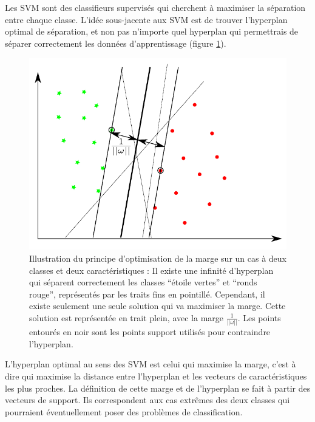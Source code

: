 Les SVM sont des classifieurs supervisés qui cherchent à maximiser la séparation entre chaque classe. L'idée sous-jacente aux SVM est de trouver l'hyperplan optimal de séparation, et non pas n'importe quel hyperplan qui permettrais de séparer correctement les données d'apprentissage (figure \ref{fig:multiPlansSeparationSVM}). 



\begin{figure}[h]
	\label{fig:multiPlansSeparationSVM}
	\begin{center}
	\includegraphics[width=15cm]{images/multiPlansSeparationSVM}
	\end{center}
	\caption{Illustration du principe d'optimisation de la marge sur un cas à deux classes et deux caractéristiques : Il existe une infinité d'hyperplan qui séparent correctement les classes ``étoile vertes'' et ``ronds rouge'', représentés par les traits fins en pointillé. Cependant, il existe seulement une seule solution qui va maximiser la marge. Cette solution est représentée en trait plein, avec la marge $\frac{1}{||\omega||}$. Les points entourés en noir sont les points support utilisés pour contraindre l'hyperplan. }
\end{figure}


L'hyperplan optimal au sens des SVM est celui qui maximise la marge, c'est à dire qui maximise la distance entre l'hyperplan et les vecteurs de caractéristiques les plus proches. La définition de cette marge et de l'hyperplan se fait à partir des vecteurs de support. Ils correspondent aux cas extrêmes des deux classes qui pourraient éventuellement poser des problèmes de classification.

